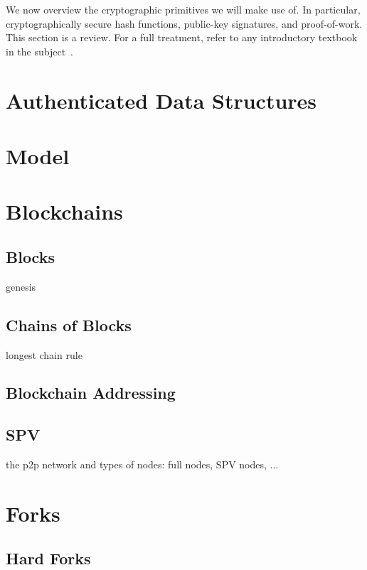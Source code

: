 We now overview the cryptographic primitives we will make use of. In particular,
cryptographically secure hash functions, public-key signatures, and
proof-of-work. This section is a review. For a full
treatment, refer to any introductory textbook in the subject~\cite{katz,handbook,foundations1,foundations2}.




\section{Authenticated Data Structures}


\section{Model}






\section{Blockchains}



\subsection{Blocks}
genesis
\subsection{Chains of Blocks}
longest chain rule
\subsection{Blockchain Addressing}
\subsection{SPV}
the p2p network and types of nodes: full nodes, SPV nodes, ...

\section{Forks}
\subsection{Hard Forks}
